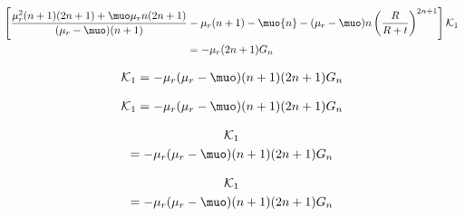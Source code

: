 \begin{multline*}
\left[\frac{\mu_r^2 (n+1) (2n+1)+\muo\mu_r n(2n+1)}{(\mu_r-\muo)(n+1)}-\mu_r(n+1)-\muo{n}-(\mu_r-\muo){n}\left(\dfrac{R}{R+t}\right)^{2n+1}\right]\mathcal{K}_1\\=-\mu_r (2n+1)G_n
\end{multline*}

\begin{multline*}
[\mu_r^2 (n+1) (2n+1)+\muo\mu_r n(2n+1)-\mu_r^2(n+1)^2+\muo\mu_r(n+1)^2-\muo\mu_r n(n+1)
+\muo^2 n(n+1)\\-(\mu_r-\muo)^2 n(n+1)\left(\dfrac{R}{R+t}\right)^{2n+1}]\mathcal{K}_1=-\mu_r (\mu_r-\muo)(n+1)(2n+1)G_n
\end{multline*}


\begin{multline*}
[\mu_r^2(2n^2+2n+n+1-n^2-2n-1)+\muo\mu_r (2n^2+n-n^2-n)+\muo\mu_r(n+1)^2+\muo^2 n(n+1)\\-(\mu_r-\muo)^2 n(n+1)\left(\dfrac{R}{R+t}\right)^{2n+1}]\mathcal{K}_1=-\mu_r(\mu_r-\muo)(n+1) (2n+1)G_n
\end{multline*}

\begin{multline*}
[\mu_r^2 n(n+1)+\muo\mu_r n^2+\muo\mu_r(n+1)^2+\muo^2 n(n+1)-(\mu_r-\muo)^2 n(n+1)\left(\dfrac{R}{R+t}\right)^{2n+1}]\mathcal{K}_1\\=-\mu_r(\mu_r-\muo)(n+1) (2n+1)G_n
\end{multline*}

\begin{multline*}
[\mu_r n(\mu_r(n+1)+\muo n)+\muo(n+1)(\mu_r(n+1)+\muo n)-(\mu_r-\muo)^2 n(n+1)\left(\dfrac{R}{R+t}\right)^{2n+1}]\mathcal{K}_1\\=-\mu_r(\mu_r-\muo)(n+1) (2n+1)G_n
\end{multline*}

